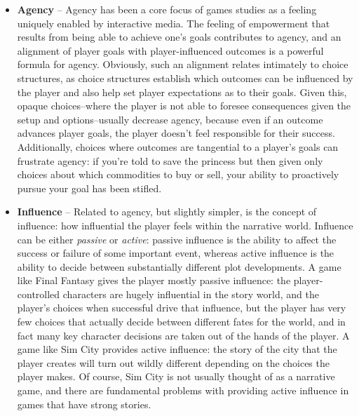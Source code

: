 \begin{itemize}
  \item \textbf{Agency} -- Agency has been a core focus of games studies as a feeling uniquely enabled by interactive media.
%
The feeling of empowerment that results from being able to achieve one's goals contributes to agency, and an alignment of player goals with player-influenced outcomes is a powerful formula for agency.
%
Obviously, such an alignment relates intimately to choice structures, as choice structures establish which outcomes can be influenced by the player and also help set player expectations as to their goals.
%
Given this, opaque choices--where the player is not able to foresee consequences given the setup and options--usually decrease agency, because even if an outcome advances player goals, the player doesn't feel responsible for their success.
%
Additionally, choices where outcomes are tangential to a player's goals can frustrate agency: if you're told to save the princess but then given only choices about which commodities to buy or sell, your ability to proactively pursue your goal has been stifled.

  \item \textbf{Influence} -- Related to agency, but slightly simpler, is the concept of influence: how influential the player feels within the narrative world.
%
Influence can be either \emph{passive} or \emph{active}: passive influence is the ability to affect the success or failure of some important event, whereas active influence is the ability to decide between substantially different plot developments.
%
A game like Final Fantasy \citep{FinalFantasy} gives the player mostly passive influence: the player-controlled characters are hugely influential in the story world, and the player's choices when successful drive that influence, but the player has very few choices that actually decide between different fates for the world, and in fact many key character decisions are taken out of the hands of the player.
%
A game like Sim City \citep{SimCity} provides active influence: the story of the city that the player creates will turn out wildly different depending on the choices the player makes.
%
Of course, Sim City is not usually thought of as a narrative game, and there are fundamental problems with providing active influence in games that have strong stories.


\end{itemize}
